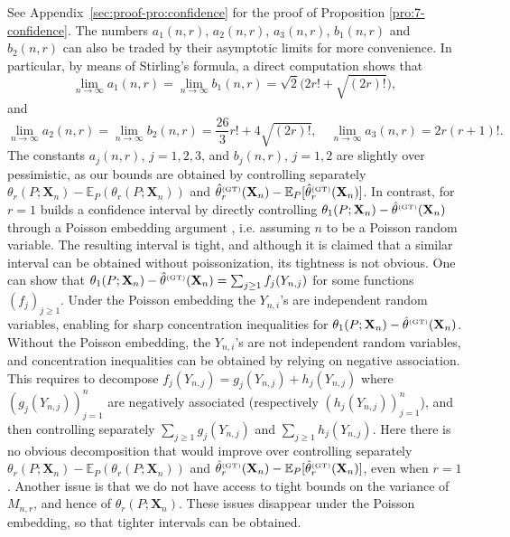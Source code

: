 \documentclass{article}
\newcommand{\1}{\boldsymbol{1}}
\newcommand{\EE}{\mathbb{E}}
\theoremstyle{plain}
\begin{document}
See Appendix~\ref{sec:proof-pro:confidence} for the proof of Proposition \ref{pro:7-confidence}. The numbers $a_1(n,r)$, $a_2(n,r)$, $a_3(n,r)$, $b_1(n,r)$ and $b_2(n,r)$ can also be traded by their asymptotic limits for more convenience. In particular, by means of Stirling's formula, a direct computation shows that
\begin{equation*}
  \lim_{n\to \infty}a_1(n,r)%
  =\lim_{n\to \infty}b_1(n,r)%
  = \sqrt{2}\Big(2r! + \sqrt{(2r)!}\Big),
\end{equation*}
and
\begin{equation*}
  \lim_{n\to \infty}a_2(n,r)%
  = \lim_{n\to\infty}b_2(n,r)
  = \frac{26}{3}r! + 4\sqrt{(2r)!},\quad%
  \lim_{n\to \infty}a_3(n,r)%
  = 2r (r+1)!.
\end{equation*}
The constants $a_j(n,r)$, $j=1,2,3$, and $b_j(n,r)$, $j=1,2$ are slightly over pessimistic, as our bounds are obtained by controlling separately $\theta_r(P;\mathbf{X}_n) - \EE_P(\theta_r(P;\mathbf{X}_n))$ and $\hat{\theta}_{r}^{\text{\tiny{(GT)}}}(\mathbf{X}_{n}) - \EE_P[\hat{\theta}_{r}^{\text{\tiny{(GT)}}}(\mathbf{X}_{n})]$. In contrast, for $r=1$ \cite[Proposition 5.5.]{Ben(17)} builds a confidence interval by directly controlling  $\theta_1(P;\mathbf{X}_n) - \hat{\theta}^{\text{\tiny{(GT)}}}(\mathbf{X}_{n})$ through a Poisson embedding argument \cite{Gne(07)}, i.e. assuming $n$ to be a Poisson random variable. The resulting interval is tight, and although it is claimed that a similar interval can be obtained without poissonization, its tightness is not obvious. One can show that $\theta_1(P;\mathbf{X}_n) - \hat{\theta}^{\text{\tiny{(GT)}}}(\mathbf{X}_{n}) = \sum_{j\geq 1}f_j(Y_{n,j})$ for some functions $(f_j)_{j\geq 1}$. Under the Poisson embedding the $Y_{n,i}$'s are independent random variables,  enabling for sharp concentration inequalities for $\theta_1(P;\mathbf{X}_n) -  \hat{\theta}^{\text{\tiny{(GT)}}}(\mathbf{X}_{n})$. Without the Poisson embedding, the $Y_{n,i}$'s are not independent random variables, and concentration inequalities can be obtained by relying on negative association. This requires to  decompose $f_j(Y_{n,j}) = g_j(Y_{n,j}) + h_j(Y_{n,j})$ where $(g_j(Y_{n,j}))_{j=1}^{n}$  are negatively associated (respectively $(h_j(Y_{n,j}))_{j=1}^n$), and then controlling separately $\sum_{j\geq 1}g_j(Y_{n,j})$ and $\sum_{j\geq 1}h_j(Y_{n,j})$.  Here there is no obvious decomposition that would improve over controlling separately $\theta_r(P;\mathbf{X}_n) - \EE_P(\theta_r(P;\mathbf{X}_n))$ and $\hat{\theta}_{r}^{\text{\tiny{(GT)}}}(\mathbf{X}_{n}) - \EE_P[\hat{\theta}_{r}^{\text{\tiny{(GT)}}}(\mathbf{X}_{n})]$, even when $r=1$. Another issue is that we do not have access to tight bounds on the variance of $M_{n,r}$, and hence of $\theta_r(P;\mathbf{X}_n)$. These issues disappear under the Poisson embedding, so that tighter intervals can be obtained.
\end{document}
